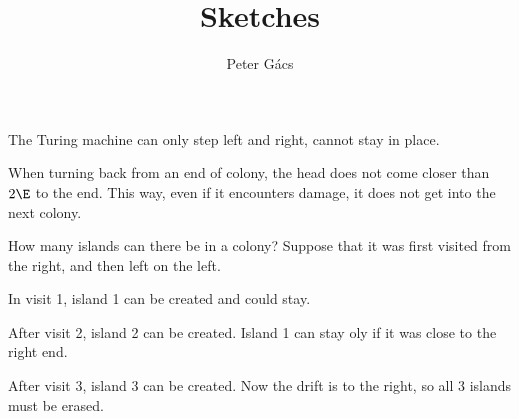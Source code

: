\documentclass[12pt]{memoir}
\begin{document}
\title{Sketches}

\author{Peter G\'acs}

\maketitle
\thispagestyle{empty}

The Turing machine can only step left and right, cannot stay in place.

When turning back from an end of colony, the head does not come closer than \( 2\E \) to 
the end.
This way, even if it encounters damage, it does not get into the next colony.

How many islands can there be in a colony?
Suppose that it was first visited from the right, and then left on the left.

In visit 1, island 1 can be created and could stay.

After visit 2, island 2 can be created.
Island 1 can stay oly if it was close to the right end.

After visit 3, island 3 can be created.
Now the drift is to the right, so all 3 islands must be erased.
\end{document}
